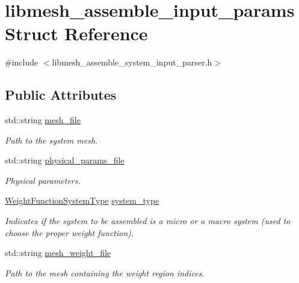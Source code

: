 \hypertarget{structlibmesh__assemble__input__params}{}\section{libmesh\+\_\+assemble\+\_\+input\+\_\+params Struct Reference}
\label{structlibmesh__assemble__input__params}


{\ttfamily \#include $<$libmesh\+\_\+assemble\+\_\+system\+\_\+input\+\_\+parser.\+h$>$}

\subsection*{Public Attributes}
\begin{DoxyCompactItemize}
\item 
std\+::string \hyperlink{structlibmesh__assemble__input__params_aaacb1a941decf01232ab3c5bd9b3bacf}{mesh\+\_\+file}
\begin{DoxyCompactList}\small\item\em Path to the system mesh. \end{DoxyCompactList}\item 
std\+::string \hyperlink{structlibmesh__assemble__input__params_a2aef9210c303764810d978496712e9b3}{physical\+\_\+params\+\_\+file}
\begin{DoxyCompactList}\small\item\em Physical parameters. \end{DoxyCompactList}\item 
\hyperlink{ext__solver__libmesh__enums_8h_acc44f45992a493fb31c90d260d4ab83f}{Weight\+Function\+System\+Type} \hyperlink{structlibmesh__assemble__input__params_a030b78e020faf6210813844e8f0c2eca}{system\+\_\+type}
\begin{DoxyCompactList}\small\item\em Indicates if the system to be assembled is a micro or a macro system (used to choose the proper weight function). \end{DoxyCompactList}\item 
std\+::string \hyperlink{structlibmesh__assemble__input__params_abac50ee0db80bff6bb89d017d1fdc27b}{mesh\+\_\+weight\+\_\+file}
\begin{DoxyCompactList}\small\item\em Path to the mesh containing the weight region indices. \end{DoxyCompactList}\item 

\end{DoxyCompactItemize}
